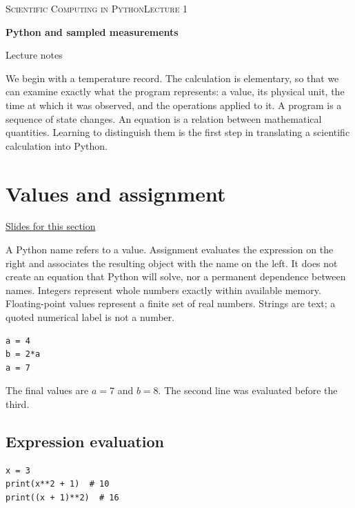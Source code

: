 \documentclass[11pt,letterpaper]{article}
\theoremstyle{definition}\newtheorem{definition}{Definition}\newtheorem{example}{Example}
\numberwithin{equation}{section}
\begin{document}
{\small\scshape Scientific Computing in Python\hfill Lecture 1}\par\medskip
{\raggedright{}\LARGE\bfseries\color{ink} Python and sampled measurements\par}\medskip
{\small Lecture notes}\par\bigskip
We begin with a temperature record. The calculation is elementary, so that we can examine exactly what the program represents: a value, its physical unit, the time at which it was observed, and the operations applied to it. A program is a sequence of state changes. An equation is a relation between mathematical quantities. Learning to distinguish them is the first step in translating a scientific calculation into Python.

\section{Values and assignment}
\hypertarget{note-values-and-assignment}{}\label{note:values-and-assignment}
{\small \href{slides.html\#frame=values-and-assignment\&step=1}{Slides for this section}}\par
A Python name refers to a value. Assignment evaluates the expression on the right and associates the resulting object with the name on the left. It does not create an equation that Python will solve, nor a permanent dependence between names. Integers represent whole numbers exactly within available memory. Floating-point values represent a finite set of real numbers. Strings are text; a quoted numerical label is not a number.

\begin{minipage}{\linewidth}
\begin{verbatim}
a = 4
b = 2*a
a = 7
\end{verbatim}
\end{minipage}

The final values are $a=7$ and $b=8$. The second line was evaluated before the third.

\subsection*{Expression evaluation}
\begin{minipage}{\linewidth}
\begin{verbatim}
x = 3
print(x**2 + 1)  # 10
print((x + 1)**2)  # 16
\end{verbatim}
\end{minipage}
\end{document}

